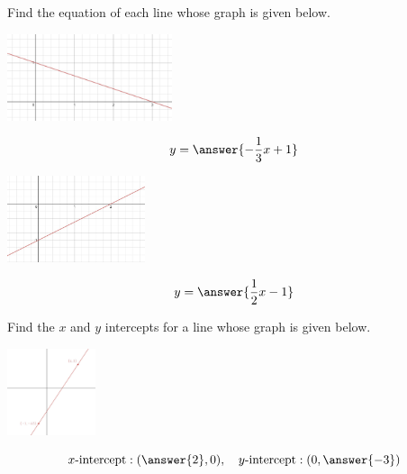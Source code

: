 \documentclass{ximera}
\begin{document}
\begin{problem}\label{prob:160hom4prob4}
Find the equation of each line whose graph is given below.

\begin{image}
   \includegraphics[height=1in]{160H4pic2.jpg}
 \end{image}
 
 $$y=\answer{-\frac{1}{3}x+1}$$
 
 \begin{image}
   \includegraphics[height=1in]{160H4pic3.jpg}
 \end{image}
 
 $$y=\answer{\frac{1}{2}x-1}$$

\end{problem}

\begin{problem}\label{prob:160hom4prob5}
Find the $x$ and $y$ intercepts for a line whose graph is given below.

 
 \begin{image}
   \includegraphics[height=1in]{160H4pic4.jpg}
 \end{image}
 
 $$x\mbox{-intercept}: (\answer{2},0),\quad y\mbox{-intercept}: (0, \answer{-3})$$
\end{problem}
\end{document}

